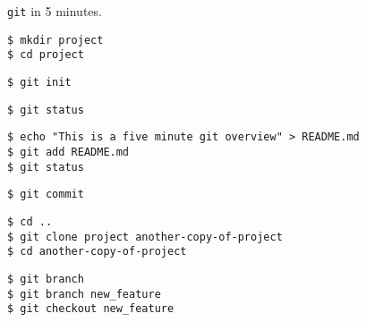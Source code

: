 \documentclass{beamer}
\begin{document}

\begin{frame}
    \begin{center}
        \Huge
        \texttt{git} \pause in 5 minutes.
    \end{center}
\end{frame}

\begin{frame}[fragile]{}
    \begin{verbatim}
$ mkdir project
$ cd project
    \end{verbatim}
\end{frame}

\begin{frame}[fragile]{}
    \begin{verbatim}
$ git init
    \end{verbatim}
\end{frame}

\begin{frame}[fragile]{}
    \begin{verbatim}
$ git status
    \end{verbatim}
\end{frame}


\begin{frame}[fragile]{}
    \begin{verbatim}
$ echo "This is a five minute git overview" > README.md
$ git add README.md
$ git status
    \end{verbatim}
\end{frame}

\begin{frame}[fragile]{}
    \begin{verbatim}
$ git commit
    \end{verbatim}
\end{frame}

\begin{frame}[fragile]{}
    \begin{verbatim}
$ cd ..
$ git clone project another-copy-of-project
$ cd another-copy-of-project
    \end{verbatim}
\end{frame}

\begin{frame}[fragile]{}
    \begin{verbatim}
$ git branch
$ git branch new_feature
$ git checkout new_feature
    \end{verbatim}
\end{frame}
\end{document}
